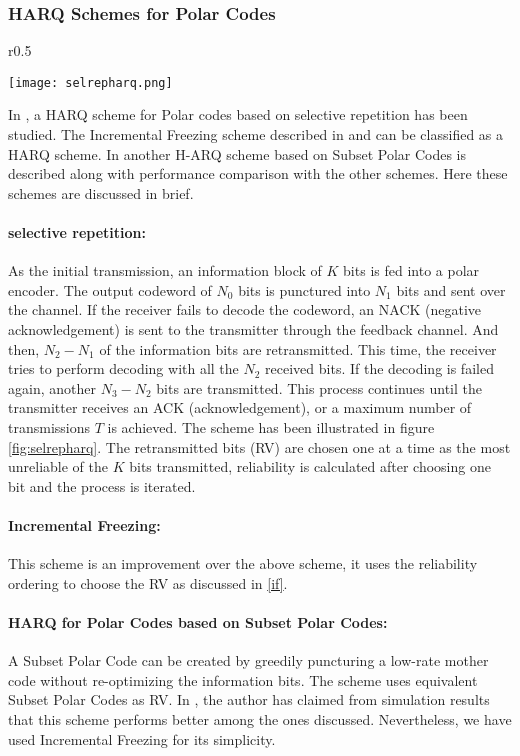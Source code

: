 \documentclass[
11pt, %
a4paper, %
oneside, %
headinclude,footinclude, %
BCOR5mm, %
]{scrartcl}
\begin{document}
\subsubsection*{HARQ Schemes for Polar Codes}
\begin{wrapfigure}{r}{0.5\textwidth}
  \begin{center}
    \texttt{[image: selrepharq.png]}
  \end{center}
  \caption{HARQ for Polar Codes with selective repetition}
  \label{fig:selrepharq}
\end{wrapfigure}
In \cite{harqchen}, a HARQ scheme for Polar codes based on selective repetition has been studied. The Incremental Freezing scheme described in \cite{chen} and \cite{mondelli} can be classified as a HARQ scheme. In \cite{harqtav} another H-ARQ scheme based on Subset Polar Codes is described along with performance comparison with the other schemes. Here these schemes are discussed in brief.            
\\\paragraph{selective repetition:}
As the initial transmission, an information block of $K$ bits is fed into a polar
encoder. The output codeword of $N_0$ bits is punctured into $N_1$
bits and sent over the channel. If the receiver fails to decode
the codeword, an NACK (negative acknowledgement) is sent
to the transmitter through the feedback channel. And then,
$N_2-N_1$ of the information bits are retransmitted. This time,
the receiver tries to perform decoding with all the $N_2$ received
bits. If the decoding is failed again, another $N_3-N_2$ bits
are transmitted. This process continues until the transmitter
receives an ACK (acknowledgement), or a maximum number
of transmissions $T$ is achieved. The scheme has been illustrated in figure  \ref{fig:selrepharq}. The retransmitted bits (RV) are chosen one at a time as the most unreliable of the $K$ bits transmitted, reliability is calculated after choosing one bit and the process is iterated.
\paragraph{Incremental Freezing:} This scheme is an improvement over the above scheme, it uses the reliability ordering to choose the RV as discussed in \ref{if}.
\paragraph{HARQ for Polar Codes based on Subset Polar Codes:}
A Subset Polar Code can be created by greedily puncturing a low-rate mother code without re-optimizing the information bits. The scheme uses equivalent Subset Polar Codes as RV. In \cite{harqtav}, the author has claimed from simulation results that this scheme performs better among the ones discussed. Nevertheless, we have used Incremental Freezing for its simplicity.  
\end{document}
